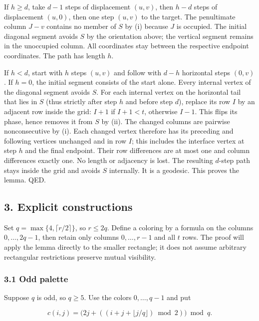 \documentclass[
  11pt,
]{article}
\begin{document}
If \(h\ge d\), take \(d-1\) steps of displacement \((u,v)\), then
\(h-d\) steps of displacement \((u,0)\), then one step \((u,v)\) to the
target. The penultimate column \(J-v\) contains no member of \(S\) by
(i) because \(J\) is occupied. The initial diagonal segment avoids \(S\)
by the orientation above; the vertical segment remains in the unoccupied
column. All coordinates stay between the respective endpoint
coordinates. The path has length \(h\).

If \(h<d\), start with \(h\) steps \((u,v)\) and follow with \(d-h\)
horizontal steps \((0,v)\). If \(h=0\), the initial segment consists of
the start alone. Every internal vertex of the diagonal segment avoids
\(S\). For each internal vertex on the horizontal tail that lies in
\(S\) (thus strictly after step \(h\) and before step \(d\)), replace
its row \(I\) by an adjacent row inside the grid: \(I+1\) if \(I+1<t\),
otherwise \(I-1\). This flips its phase, hence removes it from \(S\) by
(ii). The changed columns are pairwise nonconsecutive by (i). Each
changed vertex therefore has its preceding and following vertices
unchanged and in row \(I\); this includes the interface vertex at step
\(h\) and the final endpoint. Their row differences are at most one and
column differences exactly one. No length or adjacency is lost. The
resulting \(d\)-step path stays inside the grid and avoids \(S\)
internally. It is a geodesic. This proves the lemma. QED.

\subsection{3. Explicit constructions}\label{explicit-constructions}

Set \(q=\max\{4,\lceil r/2\rceil\}\), so \(r\le2q\). Define a coloring
by a formula on the columns \(0,\dots,2q-1\), then retain only columns
\(0,\dots,r-1\) and all \(t\) rows. The proof will apply the lemma
directly to the smaller rectangle; it does not assume arbitrary
rectangular restrictions preserve mutual visibility.

\subsubsection{3.1 Odd palette}\label{odd-palette}

Suppose \(q\) is odd, so \(q\ge5\). Use the colors \(0,\dots,q-1\) and
put

\[c(i,j)=\bigl(2j+((i+j+\lfloor j/q\rfloor)\bmod2)\bigr)\bmod q.\]
\end{document}
